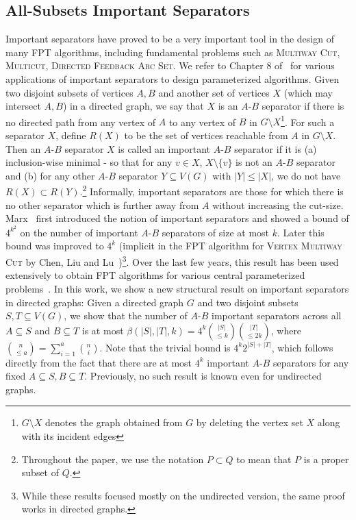 \documentclass[11pt]{article}
\begin{document}
\subsection{All-Subsets Important Separators}
Important separators have proved to be a very important tool in the design of many FPT algorithms, including fundamental problems such as {\textsc{Multiway Cut}}, {\textsc{Multicut}}, {\textsc{Directed Feedback Arc Set}}.
We refer to Chapter 8 of~\cite{cygan2015parameterized} for various applications of important separators to design parameterized algorithms. Given two disjoint subsets of vertices $A, B$ and another set of vertices $X$ (which may intersect $A,B$) in a directed graph, we say that $X$ is an $A$-$B$ separator if there is no directed path from any vertex of $A$ to any vertex of $B$ in $G \setminus X$\footnote{$G \setminus X$ denotes the graph obtained from $G$ by deleting the vertex set $X$ along with its incident edges}. For such a separator $X$, define $R(X)$ to be the set of vertices reachable from $A$ in $G \setminus X$. Then an $A$-$B$ separator $X$ is called an important $A$-$B$ separator if it is (a) inclusion-wise minimal - so that for any $v \in X$, $X \setminus \{v\}$ is not an $A$-$B$ separator and (b) for any other $A$-$B$ separator $Y \subseteq V(G)$ with $|Y| \leq |X|$, we do not have $R(X) \subset R(Y)$.\footnote{Throughout the paper, we use the notation $P \subset Q$ to mean that $P$ is a proper subset of $Q$.} Informally, important separators are those for which there is no other separator which is further away from $A$ without increasing the cut-size. Marx~\cite{marx2006parameterized} first introduced the notion of important separators and showed a bound of $4^{k^2}$ on the number of important $A$-$B$ separators of size at most $k$. Later this bound was improved to $4^k$ (implicit in the FPT algorithm for \textsc{Vertex Multiway Cut} by Chen, Liu and Lu~\cite{chen2009improved})\footnote{While these results focused mostly on the undirected version, the same proof works in directed graphs.}. Over the last few years, this result has been used extensively to obtain FPT algorithms for various central parameterized problems~\cite{marx2011fixed, chitnis2013fixed,cygan2014minimum,lokshtanov2021fpt}.
In this work, we show a new structural result on important separators in directed graphs: Given a directed graph $G$ and two disjoint subsets $S,T \subseteq V(G)$, we show that the number of $A$-$B$ important separators across all $A \subseteq S$ and $B \subseteq T$ is at most $\beta(|S|, |T|, k) = 4^k {|S| \choose \leq k} {|T| \choose \leq 2k}$, where ${n \choose \leq a} = \sum_{i = 1}^{a} {n \choose i}$. Note that the trivial bound is $4^k 2^{|S| + |T|}$, which follows directly from the fact that there are at most $4^k$ important $A$-$B$ separators for any fixed $A \subseteq S, B \subseteq T$. Previously, no such result is known even for undirected graphs. 
\end{document}
